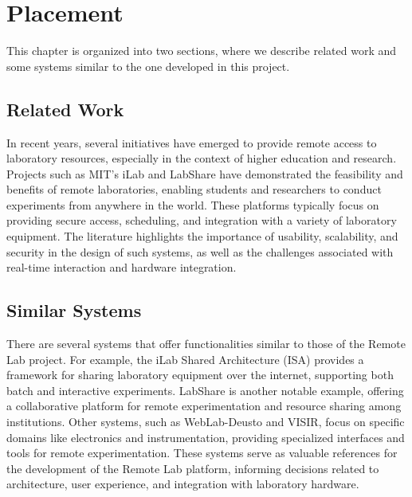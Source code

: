 %
%
\chapter{Placement} \label{cap:placement}

This chapter is organized into two sections, where we describe related work and some systems similar to the one developed in this project.

\section{Related Work}
In recent years, several initiatives have emerged to provide remote access to laboratory resources, especially in the context of higher education and research. Projects such as MIT's iLab and LabShare have demonstrated the feasibility and benefits of remote laboratories, enabling students and researchers to conduct experiments from anywhere in the world. These platforms typically focus on providing secure access, scheduling, and integration with a variety of laboratory equipment. The literature highlights the importance of usability, scalability, and security in the design of such systems, as well as the challenges associated with real-time interaction and hardware integration.

\section{Similar Systems}
There are several systems that offer functionalities similar to those of the Remote Lab project. For example, the iLab Shared Architecture (ISA) provides a framework for sharing laboratory equipment over the internet, supporting both batch and interactive experiments. LabShare is another notable example, offering a collaborative platform for remote experimentation and resource sharing among institutions. Other systems, such as WebLab-Deusto and VISIR, focus on specific domains like electronics and instrumentation, providing specialized interfaces and tools for remote experimentation. These systems serve as valuable references for the development of the Remote Lab platform, informing decisions related to architecture, user experience, and integration with laboratory hardware.
